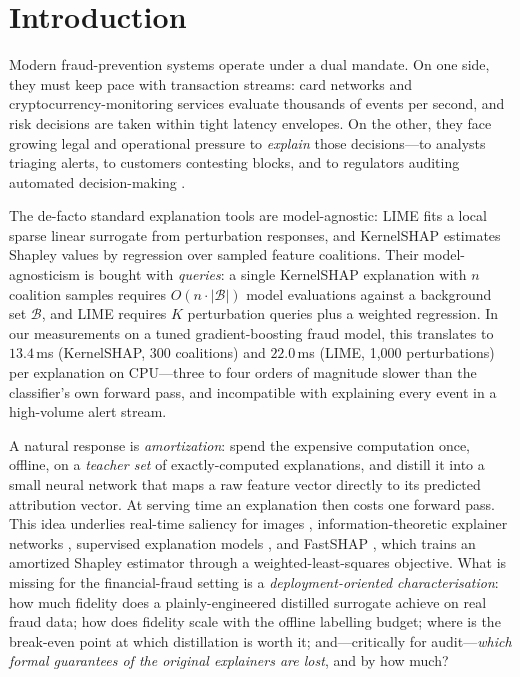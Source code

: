 \documentclass[runningheads]{llncs}
\begin{document}
\section{Introduction}
Modern fraud-prevention systems operate under a dual mandate. On one side,
they must keep pace with transaction streams: card networks and
cryptocurrency-monitoring services evaluate thousands of events per second,
and risk decisions are taken within tight latency envelopes. On the other,
they face growing legal and operational pressure to \emph{explain} those
decisions---to analysts triaging alerts, to customers contesting blocks,
and to regulators auditing automated decision-making \cite{goodman2017}.

The de-facto standard explanation tools are model-agnostic: LIME
\cite{ribeiro2016} fits a local sparse linear surrogate from perturbation
responses, and KernelSHAP \cite{lundberg2017} estimates Shapley values
\cite{shapley1953} by regression over sampled feature coalitions. Their
model-agnosticism is bought with \emph{queries}: a single KernelSHAP
explanation with $n$ coalition samples requires $O(n \cdot |\mathcal{B}|)$
model evaluations against a background set $\mathcal{B}$, and LIME requires
$K$ perturbation queries plus a weighted regression. In our measurements on
a tuned gradient-boosting fraud model, this translates to
$13.4$\,ms (KernelSHAP, 300 coalitions) and $22.0$\,ms (LIME, 1{,}000
perturbations) per explanation on CPU---three to four orders of magnitude
slower than the classifier's own forward pass, and incompatible with
explaining every event in a high-volume alert stream.

A natural response is \emph{amortization}: spend the expensive computation
once, offline, on a \emph{teacher set} of exactly-computed explanations,
and distill it \cite{hinton2015,bucilua2006} into a small neural network
that maps a raw feature vector directly to its predicted attribution
vector. At serving time an explanation then costs one forward pass. This
idea underlies real-time saliency for images \cite{dabkowski2017},
information-theoretic explainer networks \cite{chen2018l2x},
supervised explanation models \cite{schwab2019}, and FastSHAP
\cite{jethani2022}, which trains an amortized Shapley estimator through a
weighted-least-squares objective. What is missing for the financial-fraud
setting is a \emph{deployment-oriented characterisation}: how much fidelity
does a plainly-engineered distilled surrogate achieve on real fraud data;
how does fidelity scale with the offline labelling budget; where is the
break-even point at which distillation is worth it; and---critically for
audit---\emph{which formal guarantees of the original explainers are lost},
and by how much?
\end{document}
